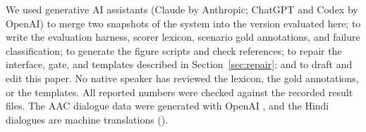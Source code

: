We used generative AI assistants (Claude by Anthropic; ChatGPT and Codex by OpenAI) to merge two snapshots of the system into the version evaluated here; to write the evaluation harness, scorer lexicon, scenario gold annotations, and failure classification; to generate the figure scripts and check references; to repair the interface, gate, and templates described in Section~\ref{sec:repair}; and to draft and edit this paper.
No native speaker has reviewed the lexicon, the gold annotations, or the templates.
All reported numbers were checked against the recorded result files.
The AAC dialogue data were generated with OpenAI , and the Hindi dialogues are machine translations ().
